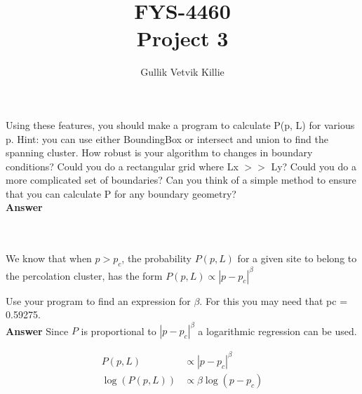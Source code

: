 \documentclass[11pt]{article}
\title{ FYS-4460 \\ Project 3 }
\author{Gullik Vetvik Killie}
\begin{document}
\lstset{language=Matlab}

\maketitle

\tableofcontents

\section{}
	Using these features, you should make a program to calculate P(p, L) for various
	p. Hint: you can use either BoundingBox or intersect and union to find
	the spanning cluster. How robust is your algorithm to changes in boundary
	conditions? Could you do a rectangular grid where Lx \( >> \) Ly? Could you do
	a more complicated set of boundaries? Can you think of a simple method to
	ensure that you can calculate P for any boundary geometry?
	\\
	\textbf{Answer}
	
	\inputminted{Matlab}{ percolation.m }

\section{}
	We know that when \(p > p_c\), the probability \(P(p, L)\) for a given site to belong to
	the percolation cluster, has the form \(P(p,L) \propto |p-p_c|^\beta\)

	Use your program to find an expression for \(\beta \). For this you may need that
	pc = 0.59275.
	\\
	\textbf{Answer}
	Since \(P\) is proportional to \( |p-p_c|^\beta \) a logarithmic regression can be used.

	\begin{align}
		P(p,L) &\propto |p-p_c|^\beta \\
		\log{(P(p,L))} &\propto \beta \log{(p-p_c)}
	\end{align}
\end{document}
